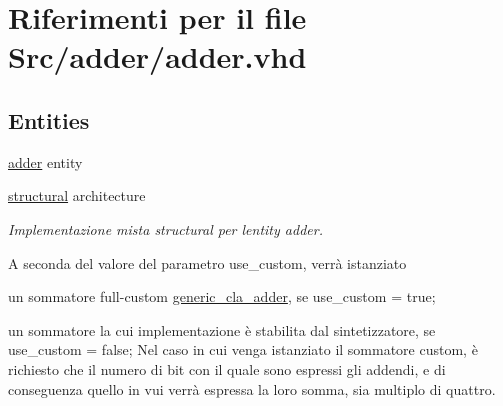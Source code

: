 \hypertarget{adder_8vhd}{}\section{Riferimenti per il file Src/adder/adder.vhd}
\label{adder_8vhd}
\subsection*{Entities}
\begin{DoxyCompactItemize}
\item 
\hyperlink{classadder}{adder} entity
\item 
\hyperlink{classadder_1_1structural}{structural} architecture
\begin{DoxyCompactList}\small\item\em Implementazione mista structural per l\textquotesingle{}entity adder.

A seconda del valore del parametro use\+\_\+custom, verrà istanziato
\begin{DoxyItemize}
\item un sommatore full-\/custom \hyperlink{classgeneric__cla__adder}{generic\+\_\+cla\+\_\+adder}, se use\+\_\+custom = true;
\item un sommatore la cui implementazione è stabilita dal sintetizzatore, se use\+\_\+custom = false; Nel caso in cui venga istanziato il sommatore custom, è richiesto che il numero di bit con il quale sono espressi gli addendi, e di conseguenza quello in vui verrà espressa la loro somma, sia multiplo di quattro. 
\end{DoxyItemize}\end{DoxyCompactList}\end{DoxyCompactItemize}


